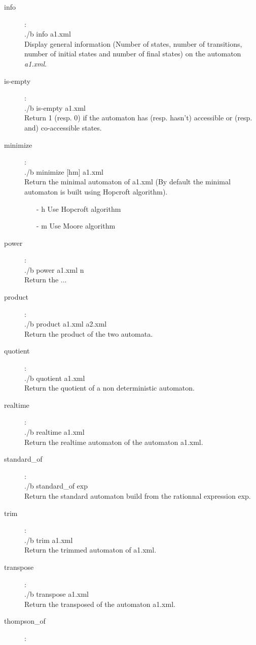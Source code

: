 \begin{description}
  \item [info] :\\
    ./b info a1.xml\\
    Display general information (Number of states, number of
    transitions, number of initial states and number of final
    states) on the automaton \textit{a1.xml}.

  \item [is-empty] :\\
    ./b is-empty a1.xml\\
    Return 1 (resp. 0) if the automaton has (resp. hasn't) accessible
    or (resp. and) co-accessible states.

  \item [minimize] :\\
    ./b minimize [hm] a1.xml\\
    Return the minimal automaton of a1.xml (By default the minimal
    automaton is built using Hopcroft algorithm).
    \begin{itemize}
      \item[-] h Use Hopcroft algorithm
      \item[-] m Use Moore algorithm
    \end{itemize}

  \item [power] :\\
    ./b power a1.xml n\\
    Return the ...

  \item [product] :\\
    ./b product a1.xml a2.xml\\
    Return the product of the two automata.

  \item [quotient] :\\
    ./b quotient a1.xml\\
    Return the quotient of a non deterministic automaton.

  \item [realtime] :\\
    ./b realtime a1.xml\\
    Return the realtime automaton of the automaton a1.xml.

  \item [standard\_of] :\\
    ./b standard\_of exp\\
    Return the standard automaton build from the rationnal expression exp.

  \item [trim] :\\
    ./b trim a1.xml\\
    Return the trimmed automaton of a1.xml.

  \item [transpose] :\\
    ./b transpose a1.xml\\
    Return the transposed of the automaton a1.xml.

  \item [thompson\_of] :\\

\end{description}

